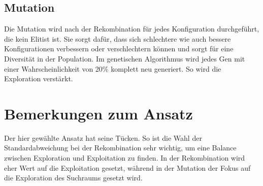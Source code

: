 \subsection{Mutation}
Die Mutation wird nach der Rekombination für jedes Konfiguration durchgeführt, die kein Elitist ist. Sie sorgt dafür, dass sich schlechtere wie auch bessere Konfigurationen verbessern oder verschlechtern können und sorgt für eine Diversität in der Population. Im genetischen Algorithmus wird jedes Gen mit einer Wahrscheinlichkeit von 20\% komplett neu generiert. So wird die Exploration verstärkt. 
\section{Bemerkungen zum Ansatz}
Der hier gewählte Ansatz hat seine Tücken. So ist die Wahl der Standardabweichung bei der Rekombination sehr wichtig, um eine Balance zwischen Exploration und Exploitation zu finden. In der Rekombination wird eher Wert auf die Exploitation gesetzt, während in der Mutation der Fokus auf die Exploration des Suchraums gesetzt wird. 